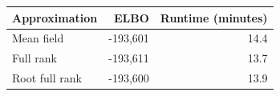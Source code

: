 \begin{tabular}{lrr}
\hline
Approximation & ELBO & Runtime (minutes) \\
\hline
Mean field & -193,601 & 14.4 \\
Full rank & -193,611 & 13.7 \\
Root full rank & -193,600 & 13.9 \\
\hline
\end{tabular}